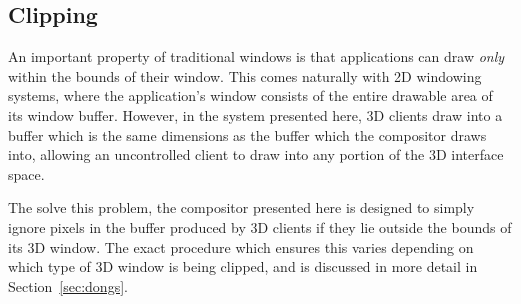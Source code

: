 \subsection{Clipping}
\label{sec:clipping}

An important property of traditional windows is that applications can draw \textit{only} within the bounds of their window. This comes naturally with 2D windowing systems, where the application's window consists of the entire drawable area of its window buffer. However, in the system presented here, 3D clients draw into a buffer which is the same dimensions as the buffer which the compositor draws into, allowing an uncontrolled client to draw into any portion of the 3D interface space.

The solve this problem, the compositor presented here is designed to simply ignore pixels in the buffer produced by 3D clients if they lie outside the bounds of its 3D window. The exact procedure which ensures this varies depending on which type of 3D window is being clipped, and is discussed in more detail in Section~\ref{sec:dongs}.